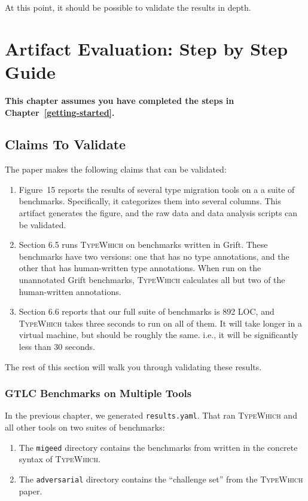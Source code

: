 \documentclass{book}
\newcommand{\system}{\textsc{TypeWhich}\xspace}
\begin{document}
At this point, it should be possible to validate the results in depth.

\chapter{Artifact Evaluation: Step by Step Guide}

\noindent
\textbf{This chapter assumes you have completed the steps in Chapter~\ref{getting-started}.}

\section{Claims To Validate}

The paper makes the following claims that can be validated:
\begin{enumerate}

    \item Figure~15 reports the results of several type migration tools on a
    a suite of benchmarks. Specifically, it categorizes them into several 
    columns. This artifact generates the figure, and the raw data and data
    analysis scripts can be validated.

    \item Section 6.5 runs \system on benchmarks written in Grift. These
    benchmarks have two versions: one that has no type annotations, and the other
    that has human-written type annotations. When run on the unannotated Grift
    benchmarks, \system calculates all but two of the human-written annotations.

    \item Section 6.6 reports that our full suite of benchmarks is 892 LOC, and
    \system{} takes three seconds to run on all of them. It will take longer in
    a virtual machine, but should be roughly the same. i.e., it will be significantly
    less than 30 seconds.

\end{enumerate}

The rest of this section will walk you through validating these results.

\subsection{GTLC Benchmarks on Multiple Tools}

In the previous chapter, we generated \texttt{results.yaml}. That
ran \system{} and all other tools on two suites of benchmarks:
\begin{enumerate}
        
\item The \texttt{migeed} directory contains the benchmarks
from \citet{migeed:decidable} written in the concrete syntax of \system.
     
\item The \texttt{adversarial} directory contains the ``challenge set'' from
the \system paper.
\end{enumerate}
\end{document}
